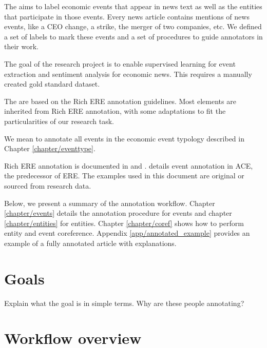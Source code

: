 The \scheme aims to label economic events that appear in news text as well as the entities that participate in those events.
Every news article contains mentions of news events, like a CEO change, a strike, the merger of two companies, etc.
We defined a set of labels to mark these events and a set of procedures to guide annotators in their work.

The goal of the \project research project is to enable supervised learning for event extraction and sentiment analysis for economic news. This requires a manually created gold standard dataset.

The \scheme are based on the Rich ERE annotation guidelines.
Most elements are inherited from Rich ERE annotation, with some adaptations to fit the particularities of our research task.

We mean to annotate all events in the economic event typology described in Chapter \ref{chapter/eventtype}.

Rich ERE annotation is documented in \cite{LDC2016.rich_ere} and \cite{Song2015}. \cite{Consortium2008a} details event annotation in ACE, the predecessor of ERE.
The examples used in this document are original or sourced from research data.


Below, we present a summary of the annotation workflow. Chapter \ref{chapter/events} details the annotation procedure for events and chapter \ref{chapter/entities} for entities. Chapter \ref{chapter/coref} shows how to perform entity and event coreference. Appendix \ref{app/annotated_example} provides an example of a fully annotated article with explanations.

\section{\project Goals}
Explain what the goal is in simple terms. Why are these people annotating?

\section{Workflow overview}

